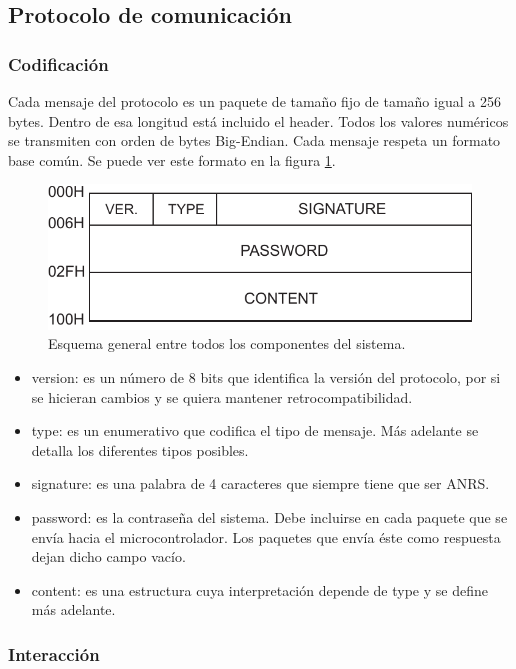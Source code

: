 \subsection{Protocolo de comunicación} \label{sec:protocolo}

\subsubsection{Codificación}

Cada mensaje del protocolo es un paquete de tamaño fijo de tamaño igual a 256 bytes.
Dentro de esa longitud está incluido el header.
Todos los valores numéricos se transmiten con orden de bytes Big-Endian.
Cada mensaje respeta un formato base común. Se puede ver este formato en la figura \ref{fig:paquete-base}.


\begin{figure}[!ht]
	\centering
	\includegraphics[width=0.6\linewidth]{imagenes/protocolo/paquete-base.pdf}
	\caption{Esquema general entre todos los componentes del sistema.}
	\label{fig:paquete-base}
\end{figure}

\begin{itemize}
	\item version: es un número de 8 bits que identifica la versión del protocolo, por si se hicieran cambios y se quiera mantener retrocompatibilidad.
	\item type: es un enumerativo que codifica el tipo de mensaje. Más adelante se detalla los diferentes tipos posibles.
	\item signature: es una palabra de 4 caracteres que siempre tiene que ser ANRS.
	\item password: es la contraseña del sistema. Debe incluirse en cada paquete que se envía hacia el microcontrolador. Los paquetes que envía éste como respuesta dejan dicho campo vacío.
	\item content: es una estructura cuya interpretación depende de type y se define más adelante.
\end{itemize}



\subsubsection{Interacción}


